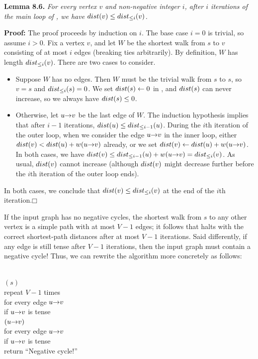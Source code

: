 \textbf{Lemma 8.6.} \textsl{For every vertex $v$ and non-negative integer $i$, after $i$ iterations of the main loop of , we have $dist(v) \le dist_{\le i}(v)$.}

\textbf{Proof:} The proof proceeds by induction on $i$.
The base case $i = 0$ is trivial, so assume $i > 0$.
Fix a vertex $v$, and let $W$ be the shortest walk from $s$ to $v$ consisting of at most $i$ edges (breaking ties arbitrarily).
By definition, $W$ has length $dist_{\le i}(v)$.
There are two cases to consider.
\begin{itemize}
\item Suppose $W$ has no edges.
Then $W$ must be the trivial walk from $s$ to $s$, so $v = s$ and $dist_{\le i}(s) = 0$.
We set $dist(s) \gets 0$ in , and $dist(s)$ can never increase, so we always have $dist(s) \le 0$.
\item Otherwise, let $u\mathord{\rightarrow}v$ be the last edge of $W$.
The induction hypothesis implies that after $i - 1$ iterations, $dist(u) \le dist_{\le i-1}(u)$.
During the $i$th iteration of the outer loop, when we consider the edge $u\mathord{\rightarrow}v$ in the inner loop, either $dist(v) < dist(u) + w(u\mathord{\rightarrow}v)$ already, or we set $dist(v) \gets dist(u) + w(u\mathord{\rightarrow}v)$.
In both cases, we have $dist(v) \le dist_{\le i-1}(u) + w(u\mathord{\rightarrow}v) = dist_{\le i}(v)$.
As usual, $dist(v)$ cannot increase (although $dist(v)$ might decrease further before the $i$th iteration of the outer loop ends).
\end{itemize}
In both cases, we conclude that $dist(v) \le dist_{\le i}(v)$ at the end of the $i$th iteration.\hfill$\mdlgwhtsquare$

If the input graph has no negative cycles, the shortest walk from $s$ to any other vertex is a simple path with at most $V - 1$ edges; it follows that  halts with the correct shortest-path distances after at most $V - 1$ iterations.
Said differently, if any edge is still tense after $V - 1$ iterations, then the input graph must contain a negative cycle!
Thus, we can rewrite the algorithm more concretely as follows:

\begin{pseudocode}
\\
$(s)$\\
repeat $V - 1$ times\\
\Indent for every edge $u\mathord{\rightarrow}v$\\
\Indent\Indent if $u\mathord{\rightarrow}v$ is tense\\
\Indent\Indent\Indent {}$(u\mathord{\rightarrow}v)$\\
for every edge $u\mathord{\rightarrow}v$\\
\Indent if $u\mathord{\rightarrow}v$ is tense\\
\Indent\Indent return “Negative cycle!”
\end{pseudocode}

